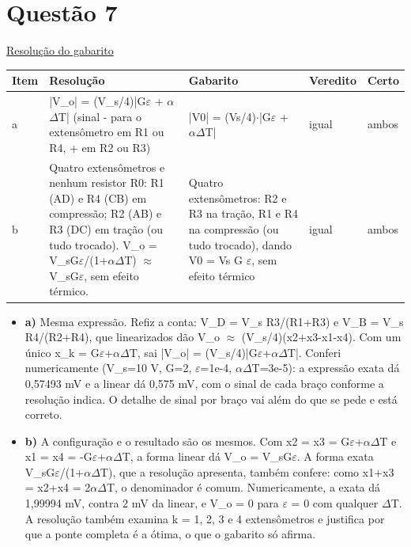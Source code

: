 \documentclass{article}%
\begin{document}
\section*{Questão 7}%
\href{https://poliedroresolve.sistemapoliedro.com.br/vestibulares/ita/2027/ita-2-fase-dia-3-22-10-2026-2-fase-dia-3/dissertativa-7-fisica-2-fase-dia-3-ita-2027}{Resolução do gabarito}\par\smallskip%
\begin{longtable}{@{}p{} p{} p{} p{} p{}@{}}\toprule Item & Resolução & Gabarito & Veredito & Certo \\ \midrule
a & |V\_o| = (V\_s/4)|G$\varepsilon$ + $\alpha$$\Delta$T| (sinal - para o extensômetro em R1 ou R4, + em R2 ou R3) & |V0| = (Vs/4)$\cdot$|G$\varepsilon$ + $\alpha$$\Delta$T| & igual & ambos \\
b & Quatro extensômetros e nenhum resistor R0: R1 (AD) e R4 (CB) em compressão; R2 (AB) e R3 (DC) em tração (ou tudo trocado). V\_o = V\_sG$\varepsilon$/(1+$\alpha$$\Delta$T) $\approx$ V\_sG$\varepsilon$, sem efeito térmico. & Quatro extensômetros: R2 e R3 na tração, R1 e R4 na compressão (ou tudo trocado), dando V0 = Vs G $\varepsilon$, sem efeito térmico & igual & ambos \\
\bottomrule\end{longtable}%
\begin{itemize}%
\item%
\textbf{a)} Mesma expressão. Refiz a conta: V\_D = V\_s R3/(R1+R3) e V\_B = V\_s R4/(R2+R4), que linearizados dão V\_o $\approx$ (V\_s/4)(x2+x3-x1-x4). Com um único x\_k = G$\varepsilon$+$\alpha$$\Delta$T, sai |V\_o| = (V\_s/4)|G$\varepsilon$+$\alpha$$\Delta$T|. Conferi numericamente (V\_s=10 V, G=2, $\varepsilon$=1e{-}4, $\alpha$$\Delta$T=3e{-}5): a expressão exata dá 0,57493 mV e a linear dá 0,575 mV, com o sinal de cada braço conforme a resolução indica. O detalhe de sinal por braço vai além do que se pede e está correto.%
\item%
\textbf{b)} A configuração e o resultado são os mesmos. Com x2 = x3 = G$\varepsilon$+$\alpha$$\Delta$T e x1 = x4 = -G$\varepsilon$+$\alpha$$\Delta$T, a forma linear dá V\_o = V\_sG$\varepsilon$. A forma exata V\_sG$\varepsilon$/(1+$\alpha$$\Delta$T), que a resolução apresenta, também confere: como x1+x3 = x2+x4 = 2$\alpha$$\Delta$T, o denominador é comum. Numericamente, a exata dá 1,99994 mV, contra 2 mV da linear, e V\_o = 0 para $\varepsilon$ = 0 com qualquer $\Delta$T. A resolução também examina k = 1, 2, 3 e 4 extensômetros e justifica por que a ponte completa é a ótima, o que o gabarito só afirma.%
\end{itemize}%
\end{document}
